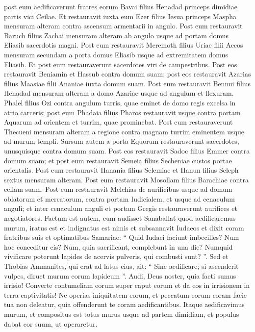 \begin{biblechapter}
\begin{biblechapter}
\begin{biblechapter}
\verse post eum aedificaverunt fratres eorum Bavai filius Henadad princeps dimidiae partis vici Ceilae. 
\verse Et restauravit iuxta eum Ezer filius Iesua princeps Maspha mensuram alteram contra ascensum armentarii in angulo.
 \verse Post eum restauravit Baruch filius Zachai mensuram alteram ab angulo usque ad portam domus Eliasib sacerdotis magni. 
\verse Post eum restauravit Meremoth filius Uriae filii Aecos mensuram secundam a porta domus Eliasib usque ad extremitatem domus Eliasib. 
\verse Et post eum restauraverunt sacerdotes viri de campestribus. 
\verse Post eos restauravit Beniamin et Hassub contra domum suam; post eos restauravit Azarias filius Maasiae filii Ananiae iuxta domum suam. 
 \verse Post eum restauravit Bennui filius Henadad mensuram alteram a domo Azariae usque ad angulum et flexuram. 
\verse Phalel filius Ozi contra angulum turris, quae eminet de domo regis excelsa in atrio carceris; post eum Phadaia filius Pharos restauravit 
\verse usque contra portam Aquarum ad orientem et turrim, quae prominebat. 
\verse Post eum restauraverunt Thecueni mensuram alteram a regione contra magnam turrim eminentem usque ad murum templi.
 \verse Sursum autem a porta Equorum restauraverunt sacerdotes, unusquisque contra domum suam. 
\verse Post eos restauravit Sadoc filius Emmer contra domum suam; et post eum restauravit Semeia filius Secheniae custos portae orientalis. 
\verse Post eum restauravit Hanania filius Selemiae et Hanun filius Seleph sextus mensuram alteram. Post eum restauravit Mosollam filius Barachiae contra cellam suam.
 \verse Post eum restauravit Melchias de aurificibus usque ad domum oblatorum et mercatorum, contra portam Iudicialem, et usque ad cenaculum anguli; 
\verse et inter cenaculum anguli et portam Gregis restauraverunt aurifices et negotiatores.
 \verse Factum est autem, cum audisset Sanaballat quod aedificaremus murum, iratus est et indignatus est nimis et subsannavit Iudaeos 
\verse et dixit coram fratribus suis et optimatibus Samariae: “ Quid Iudaei faciunt imbecilles? Num hoc conceditur eis? Num, quia sacrificant, complebunt in una die? Numquid vivificare poterunt lapides de acervis pulveris, qui combusti sunt? ”. 
\verse Sed et Thobias Ammanites, qui erat ad latus eius, ait: “ Sine aedificare; si ascenderit vulpes, diruet murum eorum lapideum ”.
 \verse Audi, Deus noster, quia facti sumus irrisio! Converte contumeliam eorum super caput eorum et da eos in irrisionem in terra captivitatis! 
\verse Ne operias iniquitatem eorum, et peccatum eorum coram facie tua non deleatur, quia offenderunt te coram aedificantibus.
 \verse Itaque aedificavimus murum, et compositus est totus murus usque ad partem dimidiam, et populus dabat cor suum, ut operaretur.
 

\end{biblechapter}
\end{biblechapter}
\end{biblechapter}
